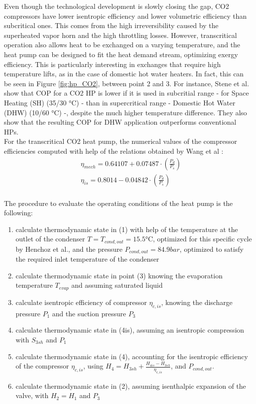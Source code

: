 \documentclass{article}
\begin{document}
Even though the technological development is slowly closing the gap, CO2 compressors have lower isentropic efficiency and lower volumetric efficiency than subcritical ones\cite{sarkarSimulationTranscriticalCO22006}. This comes from the high irreversibility caused by the superheated vapor horn and the high throttling losses\cite{yangTheoreticalExperimentalInvestigation2016}. 
However, transcritical operation also allows heat to be exchanged on a varying temperature, and the heat pump can be designed to fit the heat demand stream, optimizing exergy efficiency. This is particularly interesting in exchanges that require high temperature lifts, as in the case of domestic hot water heaters. In fact, this can be seen in Figure \ref{fig:hp_CO2}, between point 2 and 3.  For instance, Stene et al. show that COP for a CO2 HP is lower if it is used in subcritial range - for Space Heating (SH) (35/30 \si{\celsius}) - than in supercritical range - Domestic Hot Water (DHW) (10/60 \si{\celsius}) -, despite the much higher temperature difference. They also show that the resulting COP for DHW application outperforms conventional HPs\cite{steneINTEGRATEDCO2HEAT2007}.\\

For the transcritical CO2 heat pump, the numerical values of the compressor efficiencies computed with help of the relations obtained by Wang et al \cite{wangExperimentalInvestigationAirsource2013}:
\begin{align}
	& \eta_{mech} = 0.64107+0.07487\cdot(\frac{P_{d}}{P_{s}})\\
	& \eta_{is} = 0.8014-0.04842\cdot(\frac{P_{d}}{P_{s}})\\
\end{align}

The procedure to evaluate the operating conditions of the heat pump is the following:
\begin{enumerate}
	\item calculate thermodynamic state in (1) with help of the temperature at the outlet of the condenser $T = T_{cond,out} = 15.5 \si{\celsius}$, optimized for this specific cycle by Henchoz et al.\cite{henchozPerformanceProfitabilityPerspectives2015}, and the pressure $P_{cond,out} = 84.9 bar$, optimized to satisfy the required inlet temperature of the condenser
	\item calculate thermodynamic state in point (3) knowing the evaporation temperature $T_{evap}$ and assuming saturated liquid
	\item calculate isentropic efficiency of compressor $\eta_{c,is}$, knowing the discharge pressure $P_{1}$ and the suction pressure $P_{3}$
	\item calculate thermodynamic state in (4is), assuming an isentropic compression with $S_{3sh}$ and $P_{1}$
	\item calculate thermodynamic state in (4), accounting for the isentropic efficiency of the compressor $\eta_{c,is}$, using $H_{4} = H_{3sh} + \frac{H_{4is} - H_{3sh}}{\eta_{c,is}}$, and $P_{cond,out}$.
	\item calculate thermodynamic state in (2), assuming isenthalpic expansion of the valve, with $H_{2} = H_{1}$ and $P_{3}$
\end{enumerate}
\end{document}

